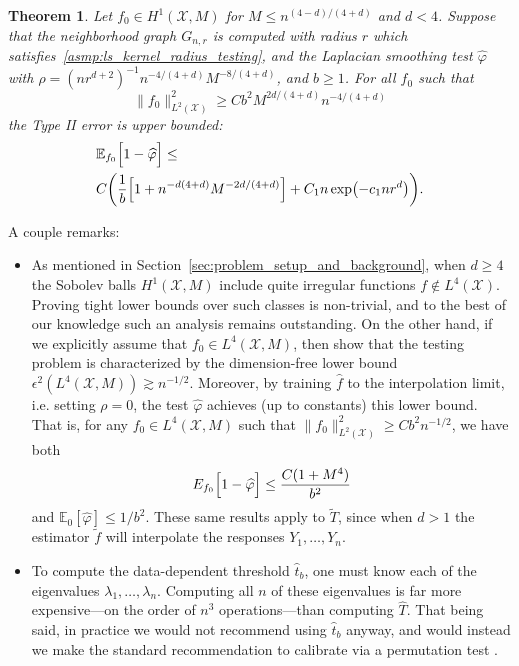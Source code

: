 \documentclass[twoside]{article}
\newcommand{\1}{\mathbf{1}}
\newcommand{\Xset}{\mathcal{X}}
\newcommand{\Leb}{L}
\newcommand{\Ebb}{\mathbb{E}}
\newcommand{\wt}[1]{\widetilde{#1}}
\newcommand{\wh}[1]{\widehat{#1}}
\newtheorem{theorem}{Theorem}
\theoremstyle{definition}
\theoremstyle{remark}
\begin{document}
\begin{theorem}
	\label{thm:laplacian_smoothing_testing}
	Let $f_0 \in H^1(\Xset,M)$ for $M \leq n^{(4 - d)/(4 + d)}$ and $d < 4$. Suppose that the neighborhood graph $G_{n,r}$ is computed with radius $r$ which satisfies~\ref{asmp:ls_kernel_radius_testing}, and the Laplacian smoothing test $\wh{\varphi}$ with $\rho = (nr^{d + 2})^{-1} n^{-4/(4 + d)} M^{-8/(4 + d)}$, and $b \geq 1$. For all $f_0$ such that
	\begin{equation}
	\label{eqn:laplacian_smoothing_testing}
	\bigl\|f_0\bigr\|_{\Leb^2(\Xset)}^2 \geq C b^2 M^{2d/(4 + d)} n^{-4/(4 + d)}
	\end{equation} 
	the Type II error is upper bounded:
	\begin{align*}
	& \Ebb_{f_0}\Bigl[1 - \wh{\varphi} \Bigr] \leq \\
	& C\biggl(\frac{1}{b}\Bigl[1 + n^{-d(4 + d)}M^{-2d/(4 + d)}\Bigr] + C_1n\exp\bigl(-c_1nr^d\bigr)\biggr).
	\end{align*}
\end{theorem}
A couple remarks:
\begin{itemize}
	\item As mentioned in Section~\ref{sec:problem_setup_and_background}, when $d \geq 4$ the Sobolev balls $H^1(\Xset,M)$ include quite irregular functions $f \not\in \Leb^4(\Xset)$. Proving tight lower bounds over such classes is non-trivial, and to the best of our knowledge such an analysis remains outstanding. On the other hand, if we explicitly assume that $f_0 \in \Leb^4(\Xset,M)$, then \cite{guerre02} show that the testing problem is characterized by the dimension-free lower bound $\epsilon^{2}(\Leb^4(\Xset,M)) \gtrsim n^{-1/2}$. Moreover, by training $\wh{f}$ to the interpolation limit, i.e. setting $\rho = 0$, the test $\wh{\varphi}$ achieves (up to constants) this lower bound. That is, for any $f_0 \in \Leb^4(\Xset,M)$ such that $\|f_0\|_{\Leb^2(\Xset)}^2 \geq C b^2n^{-1/2}$, we have both
	\begin{equation}
	\label{eqn:laplacian_smoothing_testing_low_smoothness}
	E_{f_0}\Bigl[1 - \wh{\varphi}\Bigr] \leq \frac{C(1 + M^4)}{b^2}
	\end{equation} 
	and $\Ebb_0[\wh{\varphi}] \leq 1/b^2$. These same results apply to $\wt{T}$, since when $d > 1$ the estimator $\wt{f}$ will interpolate the responses $Y_1,\ldots,Y_n$.
	\item To compute the data-dependent threshold $\wh{t}_b$, one must know each of the eigenvalues $\lambda_1,\ldots,\lambda_n$. Computing all $n$ of these eigenvalues is far more expensive---on the order of $n^3$ operations---than computing $\wh{T}$. That being said, in practice we would not recommend using $\wh{t}_b$ anyway, and would instead we make the standard recommendation to calibrate via a permutation test \citep{hoeffding1952}. 
\end{itemize}
\end{document}
